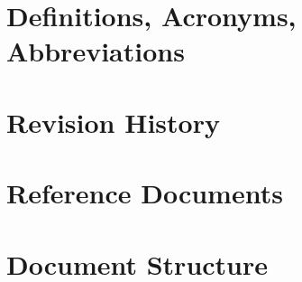 \section{Definitions, Acronyms, Abbreviations}

\section{Revision History}

\section{Reference Documents}

\section{Document Structure}